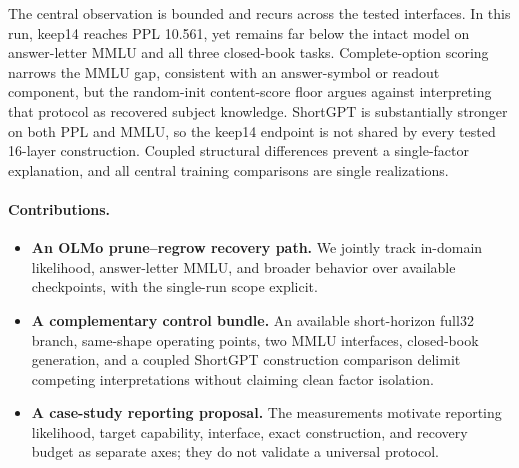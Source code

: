 The central observation is bounded and recurs across the tested interfaces. In
this run, keep14 reaches
PPL 10.561, yet remains far below the intact model on answer-letter MMLU and
all three closed-book tasks. Complete-option scoring narrows the MMLU gap,
consistent with an answer-symbol or readout component, but the random-init
content-score floor argues against interpreting that protocol as recovered subject
knowledge. ShortGPT is substantially stronger on both PPL and MMLU, so the
keep14 endpoint is not shared by every tested 16-layer construction. Coupled
structural differences prevent a single-factor explanation, and all central
training comparisons are single realizations.

\paragraph{Contributions.}
\begin{itemize}[leftmargin=1.2em,itemsep=2pt]
\item \textbf{An OLMo prune--regrow recovery path.} We jointly track
in-domain likelihood, answer-letter MMLU, and broader behavior over available
checkpoints, with the single-run scope explicit.
\item \textbf{A complementary control bundle.} An available short-horizon
full32 branch, same-shape operating points, two MMLU interfaces, closed-book
generation, and a coupled ShortGPT construction comparison delimit competing
interpretations without claiming clean factor isolation.
\item \textbf{A case-study reporting proposal.} The measurements motivate
reporting likelihood, target capability, interface, exact construction, and
recovery budget as separate axes; they do not validate a universal protocol.
\end{itemize}
